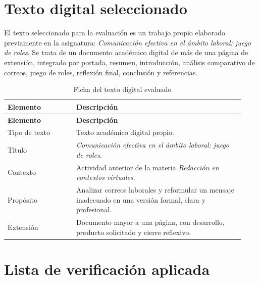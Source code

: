 \documentclass[
	spanish,
	letterpaper, oneside
]{article}
\begin{document}
\section{Texto digital seleccionado}

El texto seleccionado para la evaluación es un trabajo propio elaborado previamente en la asignatura: \textit{Comunicación efectiva en el ámbito laboral: juego de roles}. Se trata de un documento académico digital de más de una página de extensión, integrado por portada, resumen, introducción, análisis comparativo de correos, juego de roles, reflexión final, conclusión y referencias.

\begin{longtable}{@{}p{0.27\linewidth}p{0.66\linewidth}@{}}
\caption{Ficha del texto digital evaluado}\label{tab:ficha-texto}\\
\toprule
\textbf{Elemento} & \textbf{Descripción} \\
\midrule
\endfirsthead
\toprule
\textbf{Elemento} & \textbf{Descripción} \\
\midrule
\endhead
Tipo de texto & Texto académico digital propio. \\
\addlinespace
Título & \textit{Comunicación efectiva en el ámbito laboral: juego de roles}. \\
\addlinespace
Contexto & Actividad anterior de la materia \textit{Redacción en contextos virtuales}. \\
\addlinespace
Propósito & Analizar correos laborales y reformular un mensaje inadecuado en una versión formal, clara y profesional. \\
\addlinespace
Extensión & Documento mayor a una página, con desarrollo, producto solicitado y cierre reflexivo. \\
\bottomrule
\end{longtable}

\section{Lista de verificación aplicada}
\end{document}
